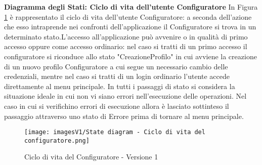 \newpage
\textbf{Diagramma degli Stati: Ciclo di vita dell'utente Configuratore}\newline
In Figura \ref{fig:State diagram 1.1} è rappresentato il ciclo di vita dell'utente Configuratore: a seconda dell'azione che esso intraprende nei confronti dell'applicazione il Configuratore si trova in un determinato stato.\newline L'accesso all'applicazione può avvenire o in qualità di primo accesso oppure come accesso ordinario: nel caso si tratti di un primo accesso il configuratore si riconduce allo stato "CreazioneProfilo" in cui avviene la creazione di un nuovo profilo Configuratore a cui segue un necessario cambio delle credenziali, mentre nel caso si tratti di un login ordinario l'utente accede direttamente al menu principale. \newline 
In tutti i passaggi di stato si considera la situazione ideale in cui non vi siano errori nell'esecuzione delle operazioni. Nel caso in cui si verifichino errori di esecuzione allora è lasciato sottinteso il passaggio attraverso uno stato di Errore prima di tornare al menu principale.

\begin{figure}[b!]
\centering
\texttt{[image: imagesV1/State diagram - Ciclo di vita del configuratore.png]}
\caption{\label{fig:State diagram 1.1}Ciclo di vita del Configuratore - Versione 1}
\end{figure}\bigskip